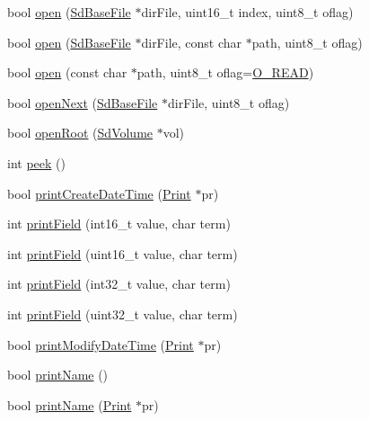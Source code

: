 \begin{DoxyCompactItemize}
\item 
bool \hyperlink{class_sd_base_file_a52c7074d47cf3798184d1fbaa7d2711a}{open} (\hyperlink{class_sd_base_file}{Sd\-Base\-File} $\ast$dir\-File, uint16\-\_\-t index, uint8\-\_\-t oflag)
\item 
bool \hyperlink{class_sd_base_file_a8359b5001f4a8382a2f945939cafd592}{open} (\hyperlink{class_sd_base_file}{Sd\-Base\-File} $\ast$dir\-File, const char $\ast$path, uint8\-\_\-t oflag)
\item 
bool \hyperlink{class_sd_base_file_a77b8ed77fc5763bd65c27e688ad750c9}{open} (const char $\ast$path, uint8\-\_\-t oflag=\hyperlink{_sd_base_file_8h_ac5a1c3e543273b0374ba114c496e662e}{O\-\_\-\-R\-E\-A\-D})
\item 
bool \hyperlink{class_sd_base_file_abd013dab96da2ef4253c7ddc9cddf14a}{open\-Next} (\hyperlink{class_sd_base_file}{Sd\-Base\-File} $\ast$dir\-File, uint8\-\_\-t oflag)
\item 
bool \hyperlink{class_sd_base_file_a2e90ca886ca5681df690eeb646758aa5}{open\-Root} (\hyperlink{class_sd_volume}{Sd\-Volume} $\ast$vol)
\item 
int \hyperlink{class_sd_base_file_a9040fa1d479d71edf3a826f4691c35c4}{peek} ()
\item 
bool \hyperlink{class_sd_base_file_a37fb3af46ea3958c7c7bdc11f3dff345}{print\-Create\-Date\-Time} (\hyperlink{class_print}{Print} $\ast$pr)
\item 
int \hyperlink{class_sd_base_file_aeb564423f405ec9e71b62926b1ef8ab5}{print\-Field} (int16\-\_\-t value, char term)
\item 
int \hyperlink{class_sd_base_file_ac9a25d21b439ac5c270ebcb42aa208db}{print\-Field} (uint16\-\_\-t value, char term)
\item 
int \hyperlink{class_sd_base_file_a5a95541e25ab84c7ddbe3404db0e2efd}{print\-Field} (int32\-\_\-t value, char term)
\item 
int \hyperlink{class_sd_base_file_a85d0c7a2190689f774a07a5bfb9668bd}{print\-Field} (uint32\-\_\-t value, char term)
\item 
bool \hyperlink{class_sd_base_file_a9a50d259cda61d39b96e4c5ee8a2e45a}{print\-Modify\-Date\-Time} (\hyperlink{class_print}{Print} $\ast$pr)
\item 
bool \hyperlink{class_sd_base_file_a57f9e42369a4b97e6b21ed0040115e17}{print\-Name} ()
\item 
bool \hyperlink{class_sd_base_file_ad5e2bbdaf498b66fcf393137bb30a1c2}{print\-Name} (\hyperlink{class_print}{Print} $\ast$pr)
\item 

\end{DoxyCompactItemize}
